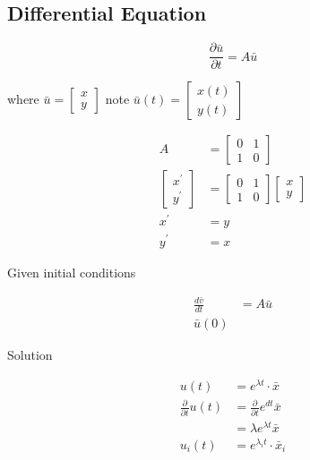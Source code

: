 \documentclass[main.tex]{subfiles}
\begin{document}
\subsection{Differential Equation}

    $$
    \frac{\partial \bar{u}}{\partial t} = A \bar{u}
    $$
    
    where $\bar{u}=\left[\begin{array}{l}x \\ y\end{array}\right]$ note $\bar{u}(t) = \left[\begin{array}{l} x(t) \\ y(t)\end{array}\right]$

    $$
    \begin{aligned}
    A&=\left[\begin{array}{ll}
    0 & 1 \\
    1 & 0
    \end{array}\right]\\
    \left[\begin{array}{l}
    x^{\prime} \\
    y^{\prime}
    \end{array}\right]&=\left[\begin{array}{ll}
    0 & 1 \\
    1 & 0
    \end{array}\right]\left[\begin{array}{l}
    x \\
    y
    \end{array}\right]\\
    x^{\prime} &=y \\
    y^{\prime} &=x
    \end{aligned}
    $$

    Given initial conditions

    $$
    \begin{aligned}
    \frac{d \bar{v}}{d t} &= A \bar{u}\\
    \bar{u}(0)&
    \end{aligned}
    $$

    Solution

    $$
    \begin{aligned}
    u(t) &= e^{\lambda t} \cdot \bar{x}\\
    \frac{\partial}{\partial t} u(t) &=\frac{\partial}{\partial t} e^{d t} \bar{x} \\
    &= \lambda e^{\lambda t} \bar{x} \\
    u_{i}(t) &= e^{\lambda_i t} \cdot \bar{x}_i
    \end{aligned}
    $$
\end{document}
